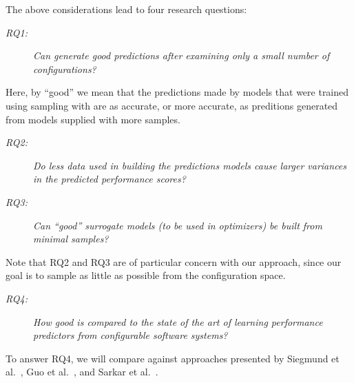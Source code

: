 The above considerations lead to four research questions:
\begin{description}
\item[{\em RQ1:}] {\em Can  \what generate good predictions after
examining only a small number of configurations?}
\end{description}
Here, by ``good'' we mean that the predictions made by models that were trained using sampling with \what are as accurate, or more accurate,
as preditions generated from models supplied with more samples.
\begin{description}
\item[{\em RQ2:}] {\em
Do less data used in building the predictions models cause larger variances in the predicted performance scores?}
\item[{\em RQ3:}] {\em
Can ``good'' surrogate models (to be used in optimizers)
be built from minimal samples?}
\end{description}
Note that RQ2 and RQ3 are of particular concern with our approach,
since our goal is to sample as little as possible from the configuration space.
\begin{description}
\item[{\em RQ4:}] {\em How good is \what compared to the state of the art of
learning performance predictors from configurable software systems?}
\end{description}

\noindent To answer RQ4, we will compare \what 
          against approaches presented by Siegmund et al.~\cite{siegmund2012predicting}, Guo et al.~\cite{guo2013variability}, and Sarkar et al.~\cite{sarkar2015cost}.
 

